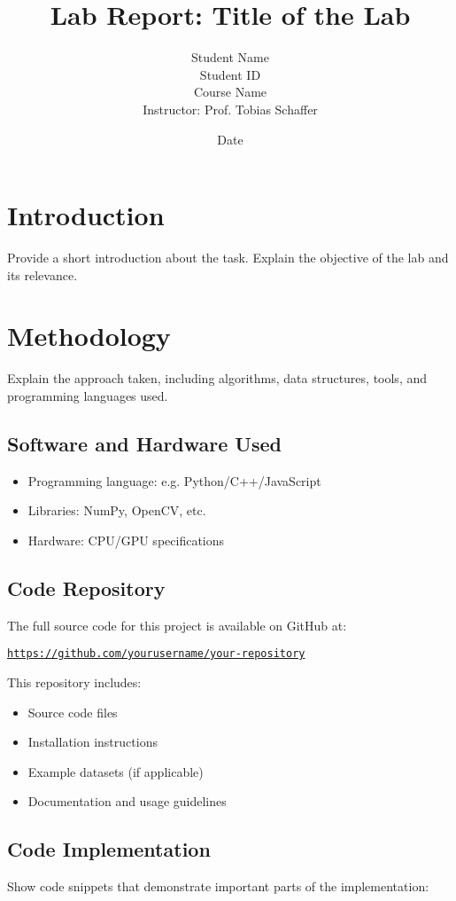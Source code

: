 \documentclass[a4paper,12pt]{article}
\title{Lab Report: \textbf{Title of the Lab}}
\author{Student Name \\ Student ID \\ Course Name \\ Instructor: Prof. Tobias Schaffer}
\date{Date}
\begin{document}
\maketitle

\section{Introduction}
Provide a short introduction about the task. Explain the objective of the lab and its relevance.

\section{Methodology}
Explain the approach taken, including algorithms, data structures, tools, and programming languages used.

\subsection{Software and Hardware Used}
\begin{itemize}
    \item Programming language: e.g. Python/C++/JavaScript
    \item Libraries: NumPy, OpenCV, etc.
    \item Hardware: CPU/GPU specifications
\end{itemize}

\subsection{Code Repository}
The full source code for this project is available on GitHub at:

\begin{center}
\href{https://github.com/yourusername/your-repository}{\texttt{https://github.com/yourusername/your-repository}}
\end{center}

This repository includes:
\begin{itemize}
    \item Source code files
    \item Installation instructions
    \item Example datasets (if applicable)
    \item Documentation and usage guidelines
\end{itemize}

\subsection{Code Implementation}
Show code snippets that demonstrate important parts of the implementation:
\end{document}

